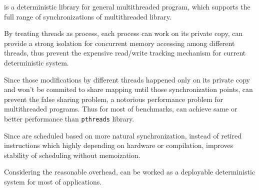 \label{sec:conclusion}
\dthreads{} is a deterministic library for general multithreaded program, which supports
the full range of synchronizations of multithreaded library.
 
By treating threads as process, each process can work on its private copy, 
\dthreads{} can provide a strong isolation for concurrent memory accessing among different threads, 
thus prevent the expensive read/write tracking mechanism for current deterministic system. 

Since those modifications by different threads happened only on its private copy and won't be 
commited to share mapping until those synchronization points, 
\dthreads{} can prevent the false sharing problem, a notorious performance
problem for multithreaded programs.
Thus for most of benchmarks, \dthreads{} can achieve same or better performance than \texttt{pthreads} library.

Since \dthreads{} are scheduled based on more natural synchronization, instead of 
retired instructions which highly depending on hardware or compilation, 
\dthreads{} improves stability of scheduling without memoization. 

Considering the reasonable overhead, \dthreads{} can be worked as a deployable deterministic system 
for most of applications. 
